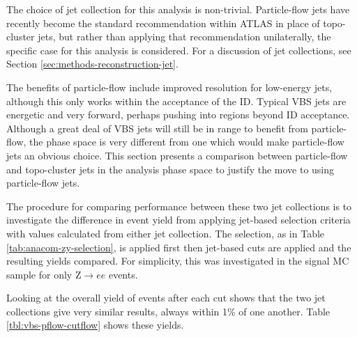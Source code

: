 
The choice of jet collection for this analysis is non-trivial. Particle-flow
jets have recently become the standard recommendation within \ac{ATLAS} in place
of topo-cluster jets, but rather than applying that recommendation unilaterally,
the specific case for this analysis is considered. For a discussion of jet
collections, see Section \ref{sec:methods-reconstruction-jet}.

The benefits of particle-flow include improved resolution for low-energy jets,
although this only works within the acceptance of the \ac{ID}.  Typical \ac{VBS}
jets are energetic and very forward, perhaps pushing into regions beyond \ac{ID}
acceptance.  Although a great deal of \ac{VBS} jets will still be in range to
benefit from particle-flow, the phase space is very different from one which
would make particle-flow jets an obvious choice. This section presents a
comparison between particle-flow and topo-cluster jets in the analysis phase
space to justify the move to using particle-flow jets.

The procedure for comparing performance between these two jet collections is to
investigate the difference in event yield from applying jet-based selection
criteria with values calculated from either jet collection.  The \Zy selection,
as in Table \ref{tab:anacom-zy-selection}, is applied first then jet-based cuts
are applied and the resulting yields compared.  For simplicity, this was
investigated in the signal \ac{MC} sample for only Z$\to ee$ events.

Looking at the overall yield of events after each cut shows that
the two jet collections give very similar results, always within 1\% of one
another. Table \ref{tbl:vbs-pflow-cutflow} shows these yields.

